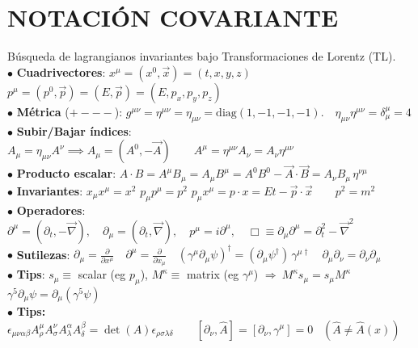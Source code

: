 
\section{NOTACIÓN COVARIANTE}
Búsqueda de lagrangianos invariantes bajo Transformaciones de Lorentz (TL).
\\$\bullet$ \textbf{Cuadrivectores}:
$ x^\mu = (x^0, \vec{x}) = (t, x, y, z) $ \;\;\; $ p^\mu = (p^0, \vec{p}) = (E, \vec{p}) = (E, p_x, p_y, p_z) $\\
$\bullet$ \textbf{Métrica} ($+---$): $ g^{\mu \nu } =\eta^{\mu\nu} = \eta_{\mu\nu} = \text{diag}(1, -1, -1, -1). \quad  \eta_{\mu\nu} \eta^{\mu\nu} = \delta^\mu_\mu = 4$\\
$\bullet$ \textbf{Subir/Bajar índices}: $A_\mu = \eta_{\mu\nu} A^\nu \implies A_\mu = (A^0, -\vec{A})\quad \quad A^\mu = \eta^{\mu \nu} A_\nu = A_\nu \eta ^{\mu \nu}$ \\
$\bullet$ \textbf{Producto escalar}: $ A \cdot B = A^\mu B_\mu =A_\mu B^\mu = A^0 B^0 - \vec{A} \cdot \vec{B} = A_\nu B_\mu\, \eta^{\nu \mu} $\\
$\bullet$ \textbf{Invariantes}: $x_\mu x^\mu = x^2$ \;\;\; $p_\mu p^\mu = p^2 $\;\;\; $p_\mu x^\mu=p \cdot x = Et - \vec{p}\cdot\vec{x}\quad \quad p^2 = m^2$\\
$\bullet$ \textbf{Operadores}: $ \partial^\mu = (\partial_t, -\vec{\nabla}), \quad \partial_\mu = (\partial_t, \vec{\nabla}), \quad p^\mu =  i\partial^\mu , \quad  \Box \equiv \partial_\mu \partial^\mu = \partial_t^2 - \vec{\nabla}^2 $\\
$\bullet$ \textbf{Sutilezas}: $\partial_\mu = \frac{\partial}{\partial x^\mu} \quad \partial^\mu = \frac{\partial }{\partial x_\mu} \quad (\gamma^\mu \partial_\mu\psi )^\dagger = (\partial_\mu \psi^\dagger)\,\gamma^{\mu \dagger} \quad \partial_\mu \partial_\nu = \partial_\nu \partial_\mu\quad$\\
$\bullet$ \textbf{Tips}: $s_\mu \!\equiv\!$ scalar (eg $p_\mu$), $M^\kappa \!\equiv\!$ matrix (eg $\gamma^\mu$) $\Rightarrow\ M^\kappa s_\mu = s_\mu M^\kappa $\;\;$\gamma^5 \partial_\mu \psi = \partial_\mu (\gamma^5 \psi)$\\
$\bullet$ \textbf{Tips:} $\epsilon_{\mu \nu \alpha \beta} A^{\mu}_{\rho} A^{\nu}_{\sigma} A^{\alpha}_{\lambda} A^{\beta}_{\delta} = \det(A) \epsilon_{\rho \sigma \lambda \delta} \quad \quad [\partial_\nu,\hat{A}] = [\partial_\nu , \gamma^\mu] = 0 \;\;\;(\hat{A} \neq \hat{A}(x))$



